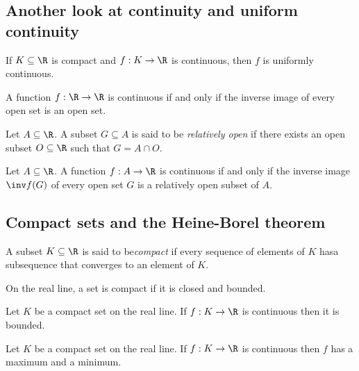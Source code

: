\documentclass{article}
\begin{document}
\subsection{Another look at continuity and uniform continuity}

\begin{proposition}[Notes 2.23]
    If $K\subseteq\R$ is compact and $f:K\to\R$ is continuous, then $f$ is
    uniformly continuous.
\end{proposition}

\begin{proposition}[Notes 2.24]
    A function $f:\R\to\R$ is continuous if and only if the inverse image of every
    open set is an open set.
\end{proposition}

\begin{definition}
    Let $A\subseteq\R$. A subset $G\subseteq A$ is said to be \emph{relatively open}
    if there exists an open subset $O\subseteq\R$ such that $G=A\cap O$.
\end{definition}

\begin{theorem}
    Let $A\subseteq\R$. A function $f:A\to\R$ is continuous if and only if the inverse
    image $\inv f(G)$ of every open set $G$ is a relatively open subset of $A$.
\end{theorem}

\subsection{Compact sets and the Heine-Borel theorem}

\begin{definition}
    A subset $K\subseteq\R$ is said to be\emph{compact} if every sequence of elements
    of $K$ hasa subsequence that converges to an element of $K$.
\end{definition}

\begin{theorem}[Notes 2.15]
    On the real line, a set is compact if it is closed and bounded.
\end{theorem}

\begin{theorem}[Notes 2.17]
    Let $K$ be a compact set on the real line. If $f:K\to\R$ is continuous
    then it is bounded.
\end{theorem}

\begin{theorem}
    Let $K$ be a compact set on the real line. If $f:K\to\R$ is continuous
    then $f$ has a maximum and a minimum.
\end{theorem}
\end{document}

